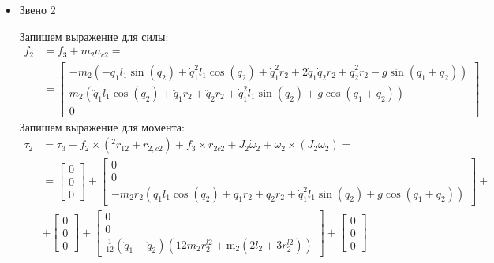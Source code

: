 \documentclass[a4paper,14pt]{extreport}
\begin{document}
\begin{itemize}
\item Звено 2

Запишем выражение для силы:
\begin{align*}
f_2 &= f_3 + m_2 a_{c2} =\\
&=
\left[\begin{matrix}- m_{2} \left(- \ddot{q}_1 l_{1} \sin{\left (q_{2} \right )} + \dot{q}_1^{2} l_{1} \cos{\left (q_{2} \right )} + \dot{q}_1^{2} r_{2} + 2 \dot{q}_1 \dot{q}_2 r_{2} + \dot{q}_2^{2} r_{2} - g \sin{\left (q_{1} + q_{2} \right )}\right)\\m_{2} \left(\ddot{q}_1 l_{1} \cos{\left (q_{2} \right )} + \ddot{q}_1 r_{2} + \ddot{q}_2 r_{2} + \dot{q}_1^{2} l_{1} \sin{\left (q_{2} \right )} + g \cos{\left (q_{1} + q_{2} \right )}\right)\\0\end{matrix}\right]
\end{align*}
Запишем выражение для момента:
\begin{align*}
\tau_2 &= \tau_3 - f_2 \times (^2 r_{12} + r_{2,c2}) + f_3 \times r_{2c2} + J_2 \dot \omega_2 + \omega_2 \times (J_2 \omega_2) =\\
&=
\left[\begin{matrix}0\\0\\0\end{matrix}\right]
+
\left[\begin{matrix}0\\0\\- m_{2} r_{2} \left(\ddot{q}_1 l_{1} \cos{\left (q_{2} \right )} + \ddot{q}_1 r_{2} + \ddot{q}_2 r_{2} + \dot{q}_1^{2} l_{1} \sin{\left (q_{2} \right )} + g \cos{\left (q_{1} + q_{2} \right )}\right)\end{matrix}\right]
+\\
&+
\left[\begin{matrix}0\\0\\0\end{matrix}\right]
+
\left[\begin{matrix}0\\0\\
\frac{1}{12} \left(\ddot{q}_1 + \ddot{q}_2\right) \left(12 m_{2} r^{l2}_{2} + \operatorname{m_{2}}{\left (2 l_{2} + 3 r^{l2}_{2} \right )}\right)\end{matrix}\right]
+
\left[\begin{matrix}0\\0\\0\end{matrix}\right]

\end{align*}
\end{itemize}
\end{document}
